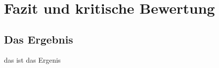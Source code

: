 \chapter{Fazit und kritische Bewertung}\label{cha:Fazit}

\section{Das Ergebnis}\label{sec:Ergebnis}
das ist das Ergenis 
